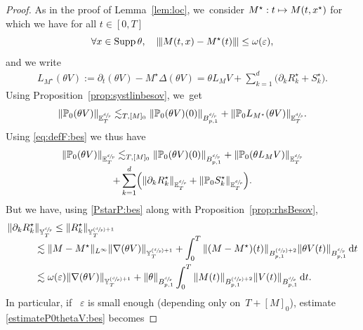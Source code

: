 \documentclass[10pt]{amsart}
\newcommand\mto{\mathchoice{\longmapsto}{\mapsto}{\mapsto}{\mapsto}}
\newcommand{\Psfrac}[2]{(\sfrac{#1}{#2})}
\DeclareMathOperator{\Supp}{Supp}
\theoremstyle{definition}
\newcommand\dd{\mathrm{d}}
\let\ep\varepsilon
\newcommand{\vertiii}[1]{{\vert\kern-0.08em\vert\kern-0.08em\vert #1 \vert\kern-0.08em\vert\kern-0.08em\vert}}
\begin{document}
\begin{proof}
As in the proof of Lemma~\ref{lem:loc}, we~consider $M^\star: t\mto M(t,x^\star)$ for which we have for all $t\in[0,T]$\vspace*{-3pt}
\begin{equation}\label{PstarP:bes}
\forall x \in \Supp \theta, \quad \vertiii{M(t,x)-M^\star(t)} \leq \omega(\ep),
\end{equation}
and we write\vspace*{-3pt}
\begin{align} \label{eq:defF:bes}
L_{M^\star}(\theta V):= \partial_t(\theta V)- M^\star \Delta (\theta V)= \theta L_{M}V + \sum_{k=1}^d \bigl(\partial_kR_k^\star + S^\star_k \bigr).
\end{align}
Using Proposition~\ref{prop:systlinbesov}, we~get\vspace*{-3pt}
\[
\|\mathbb{P}_0(\theta V)\|_{{\mathbb E}^{\sfrac dp}_T} \lesssim_{T,[M]_0} \|\mathbb{P}_0(\theta V)(0)\|_{B^{\sfrac dp}_{p,1}} + \|\mathbb{P}_0 L_{M^\star}(\theta V)\|_{{\mathbb E}^{\sfrac dp}_T}.
\]
Using \eqref{eq:defF:bes} we thus have\vspace*{-5pt}
\begin{multline}\label{estimateP0thetaV:bes}
\|\mathbb{P}_0(\theta V)\|_{{\mathbb E}^{\sfrac dp}_T} \lesssim_{T,[M]_0} \|\mathbb{P}_0(\theta V)(0)\|_{B^{\sfrac dp}_{p,1}} + \|\mathbb{P}_0 (\theta L_{M}V) \|_{{\mathbb E}^{\sfrac dp}_T} \\[-3pt]
+ \sum_{k=1}^d\Bigl(\|\partial_k R_k^\star\|_{{\mathbb E}^{\sfrac dp}_T} + \|\mathbb{P}_0 S_k^\star\|_{{\mathbb E}^{\sfrac dp}_T} \Bigr).
\end{multline}
But we have, using \eqref{PstarP:bes} along with Proposition~\ref{prop:rhsBesov},
\[
\begin{aligned}
\|\partial_k R_k^\star&\|_{{\mathbb Y}^{\sfrac dp}_T} \leq \| R_k^\star\|_{{\mathbb Y}^{\Psfrac dp+1}_T} \\[-5pt]
& \lesssim \|M - M^\star\|_{L^\infty } \|\nabla (\theta V)\|_{ {\mathbb Y}^{\Psfrac dp+1}_T}+
\int_0^T \| (M - M^\star)(t)\|_{B^{\Psfrac dp+2}_{p,1}} \|\theta V(t)\|_{B^{\sfrac dp}_{p,1}} \, \dd t\\
&\lesssim \omega(\ep) \| \nabla(\theta V) \|_{{\mathbb Y}^{\Psfrac dp+1}_T} + \|\theta \|_{ B^{\sfrac dp}_{p,1}} \int_0^T
\| M(t)\|_{ B^{\Psfrac dp+2}_{p,1}} \|V(t)\|_{ B^{\sfrac dp}_{p,1}}\, \dd t.
\end{aligned}
\]
In particular, if ~$\ep $ is small enough (depending only on~$T+[M]_0$), estimate \eqref{estimateP0thetaV:bes} becomes\vspace*{-3pt}

\end{proof}
\end{document}

